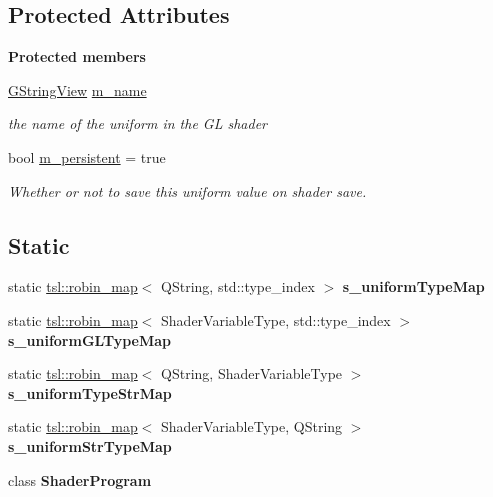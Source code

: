 \subsection*{Protected Attributes}
\begin{Indent}\textbf{ Protected members}\par
\begin{DoxyCompactItemize}
\item 
\mbox{\label{structrev_1_1_uniform_aeb272cc37f901317a58d64cec6611a5c}} 
\mbox{\hyperlink{classrev_1_1_g_string_view}{G\+String\+View}} \mbox{\hyperlink{structrev_1_1_uniform_aeb272cc37f901317a58d64cec6611a5c}{m\+\_\+name}}
\begin{DoxyCompactList}\small\item\em the name of the uniform in the GL shader \end{DoxyCompactList}\item 
\mbox{\label{structrev_1_1_uniform_aeb2ec0811d1ae6744ca52c96bed8d01f}} 
bool \mbox{\hyperlink{structrev_1_1_uniform_aeb2ec0811d1ae6744ca52c96bed8d01f}{m\+\_\+persistent}} = true
\begin{DoxyCompactList}\small\item\em Whether or not to save this uniform value on shader save. \end{DoxyCompactList}\end{DoxyCompactItemize}
\end{Indent}
\subsection*{Static}
\begin{DoxyCompactItemize}
\item 
static \mbox{\hyperlink{classtsl_1_1robin__map}{tsl\+::robin\+\_\+map}}$<$ Q\+String, std\+::type\+\_\+index $>$ {\bfseries s\+\_\+uniform\+Type\+Map}
\item 
static \mbox{\hyperlink{classtsl_1_1robin__map}{tsl\+::robin\+\_\+map}}$<$ Shader\+Variable\+Type, std\+::type\+\_\+index $>$ {\bfseries s\+\_\+uniform\+G\+L\+Type\+Map}
\item 
static \mbox{\hyperlink{classtsl_1_1robin__map}{tsl\+::robin\+\_\+map}}$<$ Q\+String, Shader\+Variable\+Type $>$ {\bfseries s\+\_\+uniform\+Type\+Str\+Map}
\item 
static \mbox{\hyperlink{classtsl_1_1robin__map}{tsl\+::robin\+\_\+map}}$<$ Shader\+Variable\+Type, Q\+String $>$ {\bfseries s\+\_\+uniform\+Str\+Type\+Map}
\item 
\mbox{\label{structrev_1_1_uniform_aef20119bde6aff11ffd23f3ea2131b86}} 
class {\bfseries Shader\+Program}
\end{DoxyCompactItemize}
